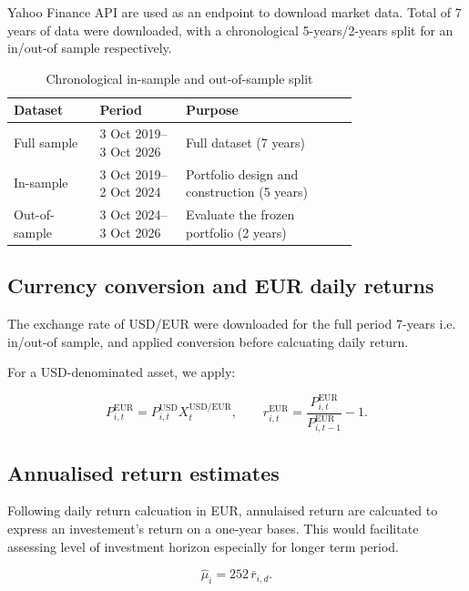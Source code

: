 \documentclass[11pt,a4paper]{article}
\begin{document}
Yahoo Finance API are used as an endpoint to download market data. Total of 7 years of data were downloaded, with a chronological 5-years/2-years split for an in/out-of sample respectively.

\begin{table}[H]
  \centering
  \caption{Chronological in-sample and out-of-sample split}
  \label{tab:sample-periods}
  \begin{tabular}{lp{0.25\linewidth}p{0.50\linewidth}}
    \toprule
    Dataset & Period & Purpose \\
    \midrule
    Full sample & 3 Oct 2019--3 Oct 2026 & Full dataset (7 years) \\
    In-sample & 3 Oct 2019--2 Oct 2024 & Portfolio design and construction (5 years) \\
    Out-of-sample & 3 Oct 2024--3 Oct 2026 & Evaluate the frozen portfolio (2 years) \\
    \bottomrule
  \end{tabular}
\end{table}

\subsection{Currency conversion and EUR daily returns}

The exchange rate of USD/EUR were downloaded for the full period 7-years i.e. in/out-of sample, and applied conversion before calcuating daily return.

For a USD-denominated asset, we apply:

\begin{equation}
  P^{\mathrm{EUR}}_{i,t}
  =P^{\mathrm{USD}}_{i,t}X^{\mathrm{USD/EUR}}_t,
  \qquad
  r^{\mathrm{EUR}}_{i,t}
  =\frac{P^{\mathrm{EUR}}_{i,t}}{P^{\mathrm{EUR}}_{i,t-1}}-1.
\end{equation}

\subsection{Annualised return estimates}

Following daily return calcuation in EUR, annulaised return are calcuated to express an investement's return on a one-year bases. This would facilitate assessing level of investment horizon especially for longer term period.

\begin{equation}
  \hat\mu_i=252\,\bar r_{i,d}.
\end{equation}
\end{document}

